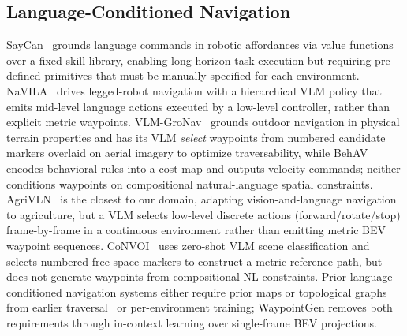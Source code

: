 \documentclass{article}
\begin{document}
\subsection{Language-Conditioned Navigation}
SayCan~\citep{ichter2023saycan} grounds language commands in robotic affordances via value functions over a fixed skill library, enabling long-horizon task execution but requiring pre-defined primitives that must be manually specified for each environment. NaVILA~\citep{cheng2025navila} drives legged-robot navigation with a hierarchical VLM policy that emits mid-level language actions executed by a low-level controller, rather than explicit metric waypoints. VLM-GroNav~\citep{elnoor2025vlmgronav} grounds outdoor navigation in physical terrain properties and has its VLM \emph{select} waypoints from numbered candidate markers overlaid on aerial imagery to optimize traversability, while BehAV~\citep{weerakoon2025behav} encodes behavioral rules into a cost map and outputs velocity commands; neither conditions waypoints on compositional natural-language spatial constraints. AgriVLN~\citep{zhao2025agrivln} is the closest to our domain, adapting vision-and-language navigation to agriculture, but a VLM selects low-level discrete actions (forward/rotate/stop) frame-by-frame in a continuous environment rather than emitting metric BEV waypoint sequences. CoNVOI~\citep{sathyamoorthy2024convoi} uses zero-shot VLM scene classification and selects numbered free-space markers to construct a metric reference path, but does not generate waypoints from compositional NL constraints. Prior language-conditioned navigation systems either require prior maps or topological graphs from earlier traversal~\citep{huang2023vlmaps,shah2023lmnav} or per-environment training; WaypointGen removes both requirements through in-context learning over single-frame BEV projections.
\end{document}
